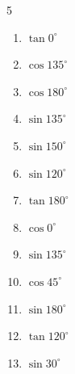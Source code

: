 \begin{multicols}{5}
\begin{enumerate}
  \item $\displaystyle \tan{0^\circ}$

        \phantom{$\displaystyle =0$}

\columnbreak %

  \item $\displaystyle \cos{135^\circ}$


  \item $\displaystyle \cos{180^\circ}$

        \phantom{$\displaystyle =-1$}

  \item $\displaystyle \sin{135^\circ}$


  \item $\displaystyle \sin{150^\circ}$


  \item $\displaystyle \sin{120^\circ}$


  \item $\displaystyle \tan{180^\circ}$

        \phantom{$\displaystyle =0$}

  \item $\displaystyle \cos{0^\circ}$

        \phantom{$\displaystyle =1$}

  \item $\displaystyle \sin{135^\circ}$


  \item $\displaystyle \cos{45^\circ}$


  \item $\displaystyle \sin{180^\circ}$

        \phantom{$\displaystyle =0$}

  \item $\displaystyle \tan{120^\circ}$


  \item $\displaystyle \sin{30^\circ}$


\end{enumerate}
\end{multicols}
